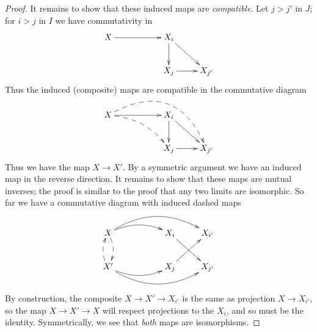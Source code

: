 \begin{proof}
        It remains to show that these induced maps are \emph{compatible}.
        Let $j>j'$ in $J$; for $i>j$ in $I$ we have commutativity in
        \begin{displaymath}
          \xymatrix{
            X \ar[rr] && X_i \ar[d] \ar[dr] \\
            && X_j \ar[r] & X_{j'}
          }
        \end{displaymath}
        Thus the induced (composite) maps are compatible in the commutative diagram
        \begin{displaymath}
          \xymatrix{
            X \ar[rr] \ar@/^35pt/@{-->}[drrr]^{} \ar@/^10pt/@{-->}[drr] && X_i \ar[d] \ar[dr] \\
            && X_j \ar[r] & X_{j'}
          }
        \end{displaymath}
        Thus we have the map $X\rightarrow X'$.
        By a symmetric argument we have an induced map in the reverse direction.
        It remains to show that these maps are mutual inverses; the proof is similar to the proof that any two limits are isomorphic.
        So far we have a commutative diagram with induced dashed maps
        \begin{displaymath}
          \xymatrix{
            X \ar@/^/@{-->}[d] \ar@/^10pt/[rr] \ar@/^20pt/[rrr]^{}
            && X_i \ar[dr] & X_{i'} \\
            X' \ar@/^/@{-->}[u] \ar@/_10pt/[rr] \ar@/_20pt/[rrr]_{}
            && X_j \ar[ur] & X_{j'}
          }
        \end{displaymath}
        By construction, the composite $X\rightarrow X' \rightarrow X_{i'}$ is the same as projection $X\rightarrow X_{i'}$, so the map $X\rightarrow X' \rightarrow X$ will respect projections to the $X_i$, and so must be the identity.
        Symmetrically, we see that \emph{both} maps are isomorphisms.
      \end{proof}



